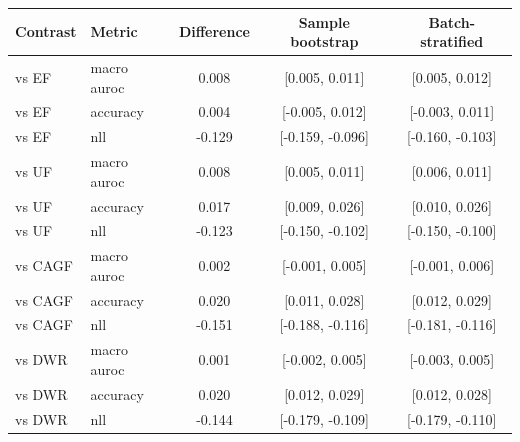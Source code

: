 \begin{tabular}{llccc}
\toprule
Contrast & Metric & Difference & Sample bootstrap & Batch-stratified \\
\midrule
vs EF & macro auroc & 0.008 & [0.005, 0.011] & [0.005, 0.012] \\
vs EF & accuracy & 0.004 & [-0.005, 0.012] & [-0.003, 0.011] \\
vs EF & nll & -0.129 & [-0.159, -0.096] & [-0.160, -0.103] \\
vs UF & macro auroc & 0.008 & [0.005, 0.011] & [0.006, 0.011] \\
vs UF & accuracy & 0.017 & [0.009, 0.026] & [0.010, 0.026] \\
vs UF & nll & -0.123 & [-0.150, -0.102] & [-0.150, -0.100] \\
vs CAGF & macro auroc & 0.002 & [-0.001, 0.005] & [-0.001, 0.006] \\
vs CAGF & accuracy & 0.020 & [0.011, 0.028] & [0.012, 0.029] \\
vs CAGF & nll & -0.151 & [-0.188, -0.116] & [-0.181, -0.116] \\
vs DWR & macro auroc & 0.001 & [-0.002, 0.005] & [-0.003, 0.005] \\
vs DWR & accuracy & 0.020 & [0.012, 0.029] & [0.012, 0.028] \\
vs DWR & nll & -0.144 & [-0.179, -0.109] & [-0.179, -0.110] \\
\bottomrule
\end{tabular}
